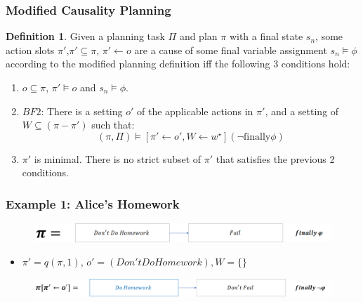 \documentclass{beamer}
\theoremstyle{plain}
\theoremstyle{definition}
\newtheorem{defn}[thm]{Definition} %
\begin{document}
\begin{frame}
\frametitle{Modified Causality Planning}
\begin{defn}
Given a planning task $\Pi$ and plan $\pi$ with a final state $s_n$, some action slots $\pi'$,$\pi' \subseteq \pi$, $\pi' \leftarrow o$ are a cause of some final variable assignment $s_n \models \phi$ according to the modified planning definition iff the following 3 conditions hold:
\begin{enumerate}
\item  $o \subseteq \pi$, $\pi' \models o$ and $s_n \models \phi$.
\item $BF2$: There is a setting $o'$ of the applicable actions in $\pi'$, and a setting of $W \subseteq (\pi  - \pi')$ such that:
\[
(\pi, \Pi) \models [\pi' \leftarrow o', W \leftarrow w^\star](\lnot \textrm{finally}\phi)
\]
\item $\pi'$ is minimal. There is no strict subset of $\pi'$ that satisfies the previous 2 conditions.
\end{enumerate}


\end{defn}

\end{frame}

\begin{frame}
\frametitle{Example 1: Alice's Homework}
\begin{figure}
\includegraphics[scale=.35]{alicePlan}
\end{figure}

\begin{itemize}
\item $\pi'= q(\pi,1)$, $o'=(Don't Do Homework), W=\{\}$
\end{itemize}

\begin{figure}
\includegraphics[scale=.35]{alicePlanCounterfactual}
\end{figure}
\end{frame}
\end{document}
